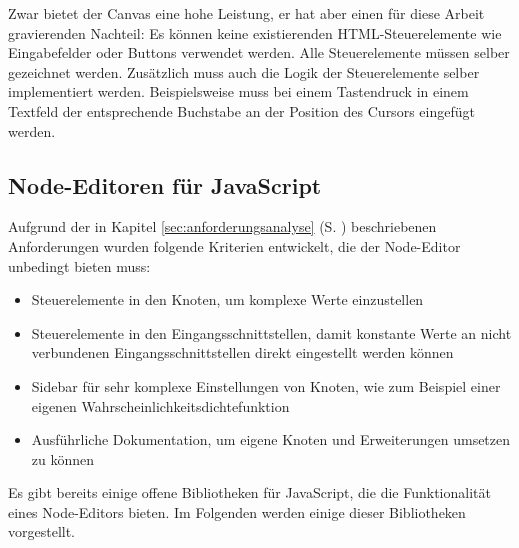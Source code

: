 Zwar bietet der Canvas eine hohe Leistung, er hat aber einen für diese Arbeit gravierenden Nachteil: Es können keine existierenden \ac{HTML}-Steuerelemente wie Eingabefelder oder Buttons verwendet werden. Alle Steuerelemente müssen selber gezeichnet werden. Zusätzlich muss auch die Logik der Steuerelemente selber implementiert werden. Beispielsweise muss bei einem Tastendruck in einem Textfeld der entsprechende Buchstabe an der Position des Cursors eingefügt werden.

\subsection{Node-Editoren für JavaScript}

Aufgrund der in Kapitel \ref{sec:anforderungsanalyse} (S. \pageref{sec:anforderungsanalyse}) beschriebenen Anforderungen wurden folgende Kriterien entwickelt, die der Node-Editor unbedingt bieten muss:
\begin{itemize}
    \item Steuerelemente in den Knoten, um komplexe Werte einzustellen
    \item Steuerelemente in den Eingangsschnittstellen, damit konstante Werte an nicht verbundenen Eingangsschnittstellen direkt eingestellt werden können
    \item Sidebar für sehr komplexe Einstellungen von Knoten, wie zum Beispiel einer eigenen Wahrscheinlichkeitsdichtefunktion
    \item Ausführliche Dokumentation, um eigene Knoten und Erweiterungen umsetzen zu können
\end{itemize}

Es gibt bereits einige offene Bibliotheken für JavaScript, die die Funktionalität eines Node-Editors bieten. Im Folgenden werden einige dieser Bibliotheken vorgestellt.


